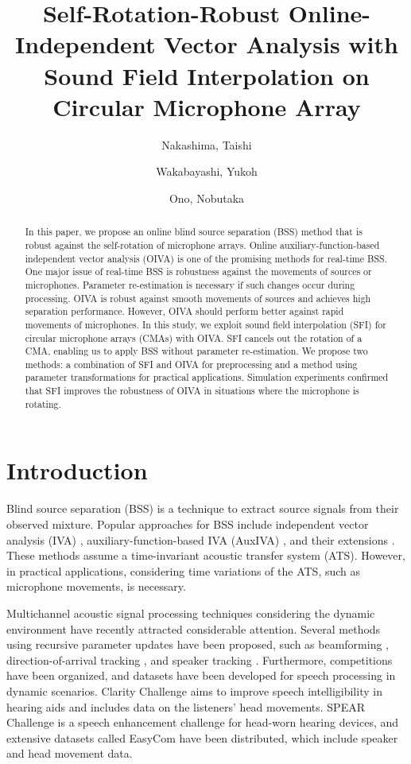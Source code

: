 \documentclass[sip,biber]{now-journal}
\title{Self-Rotation-Robust Online-Independent Vector Analysis with Sound Field Interpolation on Circular Microphone Array}
\author{Nakashima, Taishi}
\affil{Tokyo Metropolitan University, Tokyo, Japan}
\author{Wakabayashi, Yukoh}
\affil{Toyohashi University of Technology, Aichi, Japan}
\author[1]{Ono, Nobutaka}
\begin{document}
\begin{abstract}
  In this paper, we propose an online blind source separation (BSS) method that is robust against the self-rotation of microphone arrays.
  Online auxiliary-function-based independent vector analysis (OIVA) is one of the promising methods for real-time BSS.
  One major issue of real-time BSS is robustness against the movements of sources or microphones.
  Parameter re-estimation is necessary if such changes occur during processing.
  OIVA is robust against smooth movements of sources and achieves high separation performance.
  However, OIVA should perform better against rapid movements of microphones.
  In this study, we exploit sound field interpolation (SFI) for circular microphone arrays (CMAs) with OIVA.
  SFI cancels out the rotation of a CMA, enabling us to apply BSS without parameter re-estimation.
  We propose two methods: a combination of SFI and OIVA for preprocessing and a method using parameter transformations for practical applications.
  Simulation experiments confirmed that SFI improves the robustness of OIVA in situations where the microphone is rotating.
\end{abstract}

\section{Introduction}\label{sec:intro}
Blind source separation (BSS) \cite{Makino:2018:ASS} is a technique to extract source signals from their observed mixture.
Popular approaches for BSS include independent vector analysis (IVA) \cite{Kim:2006:ASLP,Hiroe:2006:ICA}, auxiliary-function-based IVA (AuxIVA) \cite{Ono:2011:WASPAA}, and their extensions \cite{Kitamura:2016:ASLP,Nugraha:2020:SPL,Brendel:2020:SP}.
These methods assume a time-invariant acoustic transfer system (ATS).
However, in practical applications, considering time variations of the ATS, such as microphone movements, is necessary.

Multichannel acoustic signal processing techniques considering the dynamic environment have recently attracted considerable attention.
Several methods using recursive parameter updates have been proposed, such as beamforming \cite{Higuchi:2017:ASLP}, direction-of-arrival tracking \cite{Weisberg:2019:ICASSP}, and speaker tracking \cite{Schwartz:2021:ASMP}.
Furthermore, competitions have been organized, and datasets have been developed for speech processing in dynamic scenarios.
Clarity Challenge \cite{Akeroyd:2023:ICASSP} aims to improve speech intelligibility in hearing aids and includes data on the listeners' head movements.
SPEAR Challenge \cite{Guiraud:2022:IWAENC} is a speech enhancement challenge for head-worn hearing devices, and extensive datasets called EasyCom \cite{Donley:2021:arxiv} have been distributed, which include speaker and head movement data.
\end{document}
